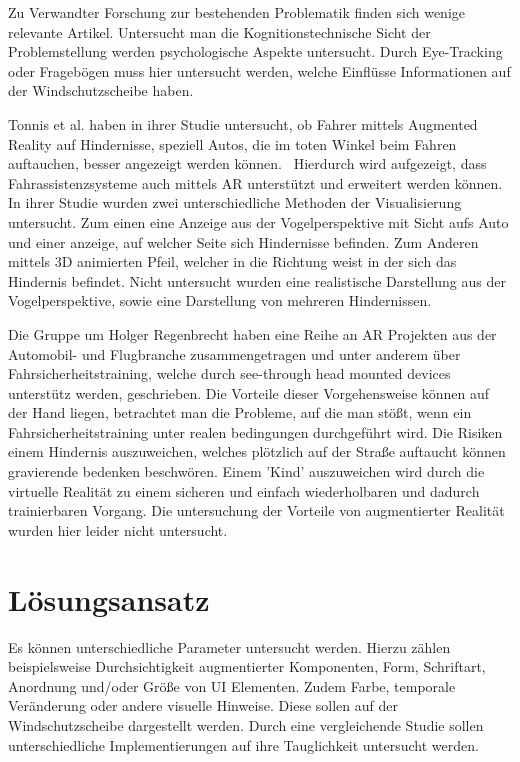 \documentclass[a4paper, 11pt]{article}
\begin{document}
Zu Verwandter Forschung zur bestehenden Problematik finden sich wenige relevante Artikel. Untersucht man die Kognitionstechnische Sicht der Problemstellung werden psychologische Aspekte untersucht. Durch Eye-Tracking oder Fragebögen muss hier untersucht werden, welche Einflüsse Informationen auf der Windschutzscheibe haben.

Tonnis et al. haben in ihrer Studie untersucht, ob Fahrer mittels Augmented Reality auf Hindernisse, speziell Autos, die im toten Winkel beim Fahren auftauchen, besser angezeigt werden können.~\cite{tonnis2005attention} Hierdurch wird aufgezeigt, dass Fahrassistenzsysteme auch mittels AR unterstützt und erweitert werden können. In ihrer Studie wurden zwei unterschiedliche Methoden der Visualisierung untersucht. Zum einen eine Anzeige aus der Vogelperspektive mit Sicht aufs Auto und einer anzeige, auf welcher Seite sich Hindernisse befinden. Zum Anderen mittels 3D animierten Pfeil, welcher in die Richtung weist in der sich das Hindernis befindet. Nicht untersucht wurden eine realistische Darstellung aus der Vogelperspektive, sowie eine Darstellung von mehreren Hindernissen. 

Die Gruppe um Holger Regenbrecht haben eine Reihe an AR Projekten aus der Automobil- und Flugbranche zusammengetragen und unter anderem über Fahrsicherheitstraining, welche durch see-through head mounted devices unterstütz werden, geschrieben. Die Vorteile dieser Vorgehensweise können auf der Hand liegen, betrachtet man die Probleme, auf die man stößt, wenn ein Fahrsicherheitstraining unter realen bedingungen durchgeführt wird. Die Risiken einem Hindernis auszuweichen, welches plötzlich auf der Straße auftaucht können gravierende bedenken beschwören. Einem 'Kind' auszuweichen wird durch die virtuelle Realität zu einem sicheren und einfach wiederholbaren und dadurch trainierbaren Vorgang. Die untersuchung der Vorteile von augmentierter Realität wurden hier leider nicht untersucht. 

\section*{Lösungsansatz}
Es können unterschiedliche Parameter untersucht werden. Hierzu zählen beispielsweise Durchsichtigkeit augmentierter Komponenten, Form, Schriftart,  Anordnung und/oder Größe von UI Elementen. Zudem Farbe, temporale Veränderung oder andere visuelle Hinweise. Diese sollen auf der Windschutzscheibe dargestellt werden. Durch eine vergleichende Studie sollen unterschiedliche Implementierungen auf ihre Tauglichkeit untersucht werden. 
\end{document}
